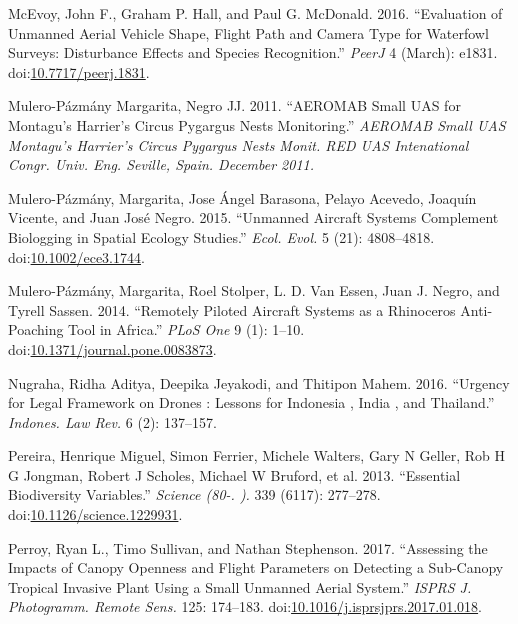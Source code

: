 \documentclass[]{interact}
\theoremstyle{plain}%
\theoremstyle{definition}
\theoremstyle{remark}
\begin{document}
\hypertarget{ref-mcevoy_evaluation_2016}{}
McEvoy, John F., Graham P. Hall, and Paul G. McDonald. 2016.
``Evaluation of Unmanned Aerial Vehicle Shape, Flight Path and Camera
Type for Waterfowl Surveys: Disturbance Effects and Species
Recognition.'' \emph{PeerJ} 4 (March): e1831.
doi:\href{https://doi.org/10.7717/peerj.1831}{10.7717/peerj.1831}.

\hypertarget{ref-mulero-pazmany_margarita_aeromab_2011}{}
Mulero-Pázmány Margarita, Negro JJ. 2011. ``AEROMAB Small UAS for
Montagu's Harrier's Circus Pygargus Nests Monitoring.'' \emph{AEROMAB
Small UAS Montagu's Harrier's Circus Pygargus Nests Monit. RED UAS
Intenational Congr. Univ. Eng. Seville, Spain. December 2011.}

\hypertarget{ref-mulero-pazmany_unmanned_2015}{}
Mulero-Pázmány, Margarita, Jose Ángel Barasona, Pelayo Acevedo, Joaquín
Vicente, and Juan José Negro. 2015. ``Unmanned Aircraft Systems
Complement Biologging in Spatial Ecology Studies.'' \emph{Ecol. Evol.} 5
(21): 4808--4818.
doi:\href{https://doi.org/10.1002/ece3.1744}{10.1002/ece3.1744}.

\hypertarget{ref-mulero-pazmany_remotely_2014}{}
Mulero-Pázmány, Margarita, Roel Stolper, L. D. Van Essen, Juan J. Negro,
and Tyrell Sassen. 2014. ``Remotely Piloted Aircraft Systems as a
Rhinoceros Anti-Poaching Tool in Africa.'' \emph{PLoS One} 9 (1): 1--10.
doi:\href{https://doi.org/10.1371/journal.pone.0083873}{10.1371/journal.pone.0083873}.

\hypertarget{ref-nugraha_urgency_2016}{}
Nugraha, Ridha Aditya, Deepika Jeyakodi, and Thitipon Mahem. 2016.
``Urgency for Legal Framework on Drones : Lessons for Indonesia , India
, and Thailand.'' \emph{Indones. Law Rev.} 6 (2): 137--157.

\hypertarget{ref-pereira_essential_2013}{}
Pereira, Henrique Miguel, Simon Ferrier, Michele Walters, Gary N Geller,
Rob H G Jongman, Robert J Scholes, Michael W Bruford, et al. 2013.
``Essential Biodiversity Variables.'' \emph{Science (80-. ).} 339
(6117): 277--278.
doi:\href{https://doi.org/10.1126/science.1229931}{10.1126/science.1229931}.

\hypertarget{ref-perroy_assessing_2017}{}
Perroy, Ryan L., Timo Sullivan, and Nathan Stephenson. 2017. ``Assessing
the Impacts of Canopy Openness and Flight Parameters on Detecting a
Sub-Canopy Tropical Invasive Plant Using a Small Unmanned Aerial
System.'' \emph{ISPRS J. Photogramm. Remote Sens.} 125: 174--183.
doi:\href{https://doi.org/10.1016/j.isprsjprs.2017.01.018}{10.1016/j.isprsjprs.2017.01.018}.
\end{document}
